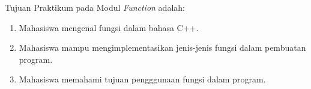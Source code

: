\documentclass[../main.tex]{subfiles}
\begin{document}
    \noindent Tujuan Praktikum pada Modul {\thechapter} \textit{Function} adalah:
    \begin{enumerate}
        \item{Mahasiswa mengenal fungsi dalam bahasa C++.}
        \item{Mahasiswa mampu mengimplementasikan jenis-jenis fungsi dalam pembuatan program.}
        \item{Mahasiswa memahami tujuan pengggunaan fungsi dalam program.}
    \end{enumerate}
\end{document}
